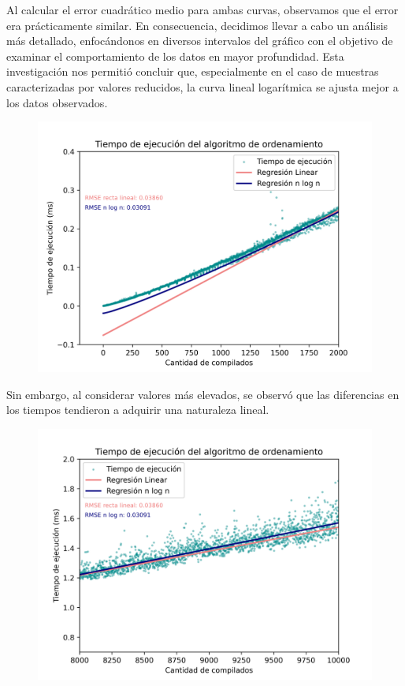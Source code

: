 Al calcular el error cuadrático medio para ambas curvas, observamos que el error era prácticamente similar.
En consecuencia, decidimos llevar a cabo un análisis más detallado,
enfocándonos en diversos intervalos del gráfico con el objetivo de examinar el comportamiento de los datos en mayor
profundidad. Esta investigación nos permitió concluir que, especialmente en el caso de muestras caracterizadas
por valores reducidos, la curva lineal logarítmica se ajusta mejor a los datos observados.

\begin{figure}[H]
    \centering
    \includegraphics[width=1\textwidth]{img/tiempos_ejecucion_zoom_bajos.png}
\end{figure}

Sin embargo, al considerar valores más elevados, se observó que las diferencias en los tiempos tendieron a adquirir una naturaleza lineal.

\begin{figure}[H]
    \centering
    \includegraphics[width=1\textwidth]{img/tiempos_ejecucion_zoom_altos.png}
\end{figure}

